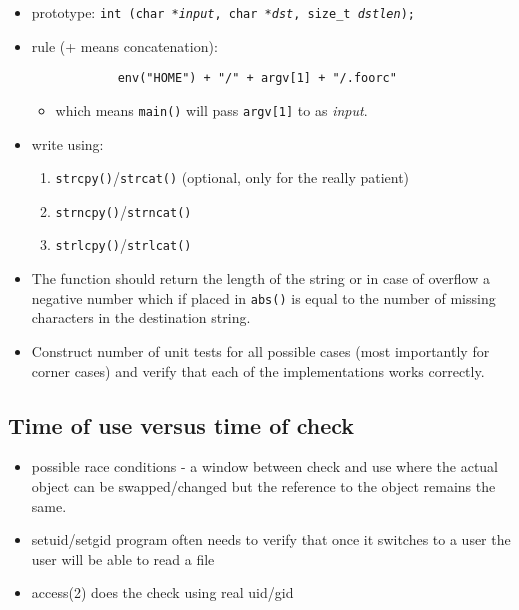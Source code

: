           \begin{itemize}
	  \item prototype: \texttt{int (char *\emph{input},
	    char *\emph{dst}, size\_t \emph{dstlen});}
	  \item rule (+ means concatenation):
          \begin{verbatim}
            env("HOME") + "/" + argv[1] + "/.foorc"
          \end{verbatim}
            \begin{itemize}
	    \item which means \texttt{main()} will pass \texttt{argv[1]}
	    to  as \emph{input}.
            \end{itemize}
 	  \item write using:
          \begin{enumerate}
	    \item \texttt{strcpy()}/\texttt{strcat()} (optional, only for
	      the really patient)
            \item \texttt{strncpy()}/\texttt{strncat()}
            \item \texttt{strlcpy()}/\texttt{strlcat()}
          \end{enumerate}
	  \item The function should return the length of the string or
             in case of overflow a negative number which if placed in
	     \texttt{abs()} is equal to the number of missing characters
	     in the destination string.
	  \item Construct number of unit tests for all possible cases
	    (most importantly for corner cases) and verify that each of the
	    implementations works correctly.
          \end{itemize}



\subsection{Time of use versus time of check}

\begin{itemize}
  \item possible race conditions - a window between check and use
    where the actual object can be swapped/changed but the reference to
    the object remains the same.
  \item setuid/setgid program often needs to verify that once it switches
    to a user the user will be able to read a file
  \item access(2) does the check using real uid/gid
\end{itemize}


